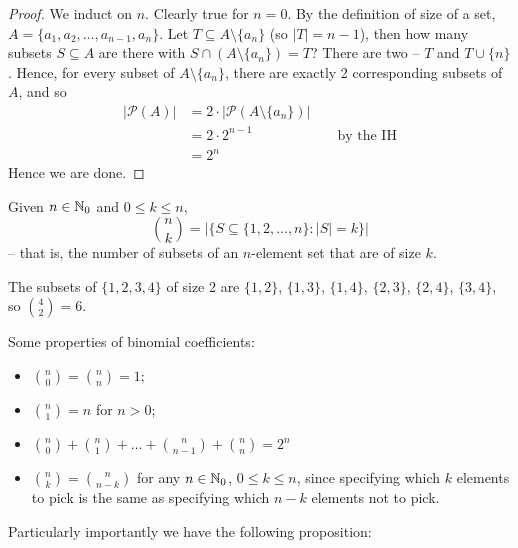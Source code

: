 \documentclass{../template/note}
\begin{document}
    \begin{proof}
        We induct on \(n\). Clearly true for \(n = 0\). By the definition of size of a set, \(A = \{a_1, a_2, \dots, a_{n-1}, a_n\}\). Let \(T \subseteq A \setminus \{a_n\}\) (so \(|T| = n-1\)), then how many subsets \(S \subseteq A\) are there with \(S \cap (A \setminus \{a_n\}) = T\)? There are two -- \(T\) and \(T \cup \{n\}\). Hence, for every subset of \(A \setminus \{a_n\}\), there are exactly 2 corresponding subsets of \(A\), and so
        \begin{align*}
            |\mathcal P(A)| &= 2 \cdot |\mathcal P(A \setminus \{a_n\})| \\
            &= 2 \cdot 2^{n-1} && \text{ by the IH} \\
            &= 2^n
        \end{align*}
        Hence we are done.
    \end{proof}
    
    \begin{definition}
        Given \(n \in \mathbb N_0\) and \(0 \leq k \leq n\),
        \[
            \binom{n}{k} = |\{S \subseteq \{1, 2, \dots, n\}: |S| = k\}|
        \]
        -- that is, the number of subsets of an \(n\)-element set that are of size \(k\).
    \end{definition}
    
    \begin{example}
        The subsets of \(\{1, 2, 3, 4\}\) of size 2 are \(\{1, 2\}\), \(\{1, 3\}\), \(\{1, 4\}\), \(\{2, 3\}\), \(\{2, 4\}\), \(\{3, 4\}\), so \(\binom 4 2 = 6\).
    \end{example}
    
    Some properties of binomial coefficients:

    \begin{itemize}
        \item \(\binom n 0 = \binom n n = 1\);
        \item \(\binom n 1 = n\) for \(n > 0\);
        \item \(\binom n 0 + \binom n 1 + \dots + \binom n {n-1} + \binom n n = 2^n\)
        \item \(\binom n k = \binom n {n-k}\) for any \(n \in \mathbb N_0\), \(0 \leq k \leq n\), since specifying which \(k\) elements to pick is the same as specifying which \(n-k\) elements not to pick.
    \end{itemize}
    
    Particularly importantly we have the following proposition:
\end{document}
